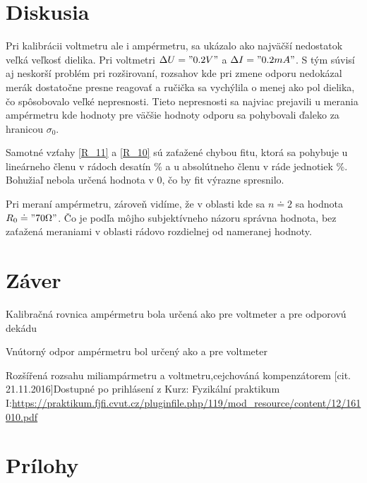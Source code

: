 \documentclass[a4paper,10pt]{article}
\begin{document}
\section{Diskusia}
Pri kalibrácii voltmetru ale i ampérmetru, sa ukázalo ako najväčší nedostatok veľká veľkosť dielika. 
Pri voltmetri $\Delta U = "0.2 V"$ a  $\Delta I = "0.2 mA"$. 
S tým súvisí aj neskorší problém pri rozširovaní, 
rozsahov kde pri zmene odporu nedokázal merák dostatočne presne reagovať 
a ručička sa vychýlila o menej ako pol dielika, čo spôsobovalo veľké nepresnosti.
Tieto nepresnosti sa najviac prejavili u merania ampérmetru kde hodnoty 
pre väčšie hodnoty odporu sa pohybovali ďaleko za hranicou $\sigma_0$.

Samotné vzťahy \ref{R_11} a \ref{R_10} sú zaťažené chybou fitu, ktorá 
sa pohybuje u lineárneho členu v rádoch desatín \% a u absolútneho členu 
v ráde jednotiek \%. Bohužiaľ nebola určená hodnota v 0, čo by fit výrazne spresnilo.

Pri meraní ampérmetru, zároveň vidíme, že v oblasti kde sa $n\doteq2$ sa hodnota $R_0\doteq "70 \Omega"$. 
Čo je podľa môjho subjektívneho názoru správna hodnota, bez zaťažená meraniami v oblasti rádovo rozdielnej od nameranej hodnoty.








\section{Záver}
Kalibračná rovnica ampérmetru bola určená ako
pre voltmeter 
a pre odporovú dekádu

Vnútorný odpor ampérmetru bol určený ako 
 a pre voltmeter

\begin{thebibliography}{2}
Rozšířená rozsahu miliampármetru a voltmetru,cejchováná kompenzátorem [cit. 21.11.2016]Dostupné po prihlásení z Kurz: Fyzikální praktikum I:\url{https://praktikum.fjfi.cvut.cz/pluginfile.php/119/mod_resource/content/12/161010.pdf}

\end{thebibliography}

\section{Prílohy}
\end{document}
